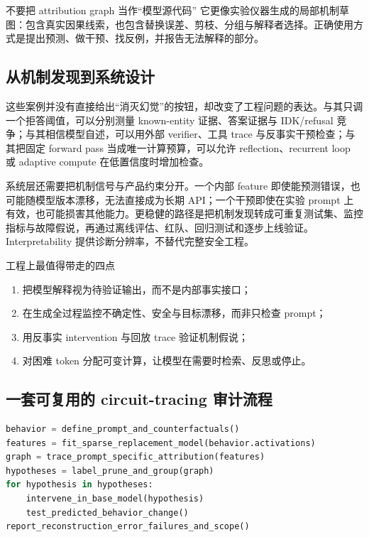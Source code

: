 \documentclass[a4paper]{article}
\begin{document}
\begin{warningbox}{不要把 attribution graph 当作“模型源代码”}
它更像实验仪器生成的局部机制草图：包含真实因果线索，也包含替换误差、剪枝、分组与解释者选择。正确使用方式是提出预测、做干预、找反例，并报告无法解释的部分。
\end{warningbox}

\subsection{从机制发现到系统设计}

这些案例并没有直接给出“消灭幻觉”的按钮，却改变了工程问题的表达。与其只调一个拒答阈值，可以分别测量 known-entity 证据、答案证据与 IDK/refusal 竞争；与其相信模型自述，可以用外部 verifier、工具 trace 与反事实干预检查；与其把固定 forward pass 当成唯一计算预算，可以允许 reflection、recurrent loop 或 adaptive compute 在低置信度时增加检查。

系统层还需要把机制信号与产品约束分开。一个内部 feature 即使能预测错误，也可能随模型版本漂移，无法直接成为长期 API；一个干预即使在实验 prompt 上有效，也可能损害其他能力。更稳健的路径是把机制发现转成可重复测试集、监控指标与故障假说，再通过离线评估、红队、回归测试和逐步上线验证。Interpretability 提供诊断分辨率，不替代完整安全工程。


\begin{importantbox}{工程上最值得带走的四点}
\begin{enumerate}
  \item 把模型解释视为待验证输出，而不是内部事实接口；
  \item 在生成全过程监控不确定性、安全与目标漂移，而非只检查 prompt；
  \item 用反事实 intervention 与回放 trace 验证机制假说；
  \item 对困难 token 分配可变计算，让模型在需要时检索、反思或停止。
\end{enumerate}
\end{importantbox}

\subsection{一套可复用的 circuit-tracing 审计流程}

\begin{lstlisting}[language=Python,caption={从行为问题到可证伪机制假说的审计流程}]
behavior = define_prompt_and_counterfactuals()
features = fit_sparse_replacement_model(behavior.activations)
graph = trace_prompt_specific_attribution(features)
hypotheses = label_prune_and_group(graph)
for hypothesis in hypotheses:
    intervene_in_base_model(hypothesis)
    test_predicted_behavior_change()
report_reconstruction_error_failures_and_scope()
\end{lstlisting}
\end{document}
